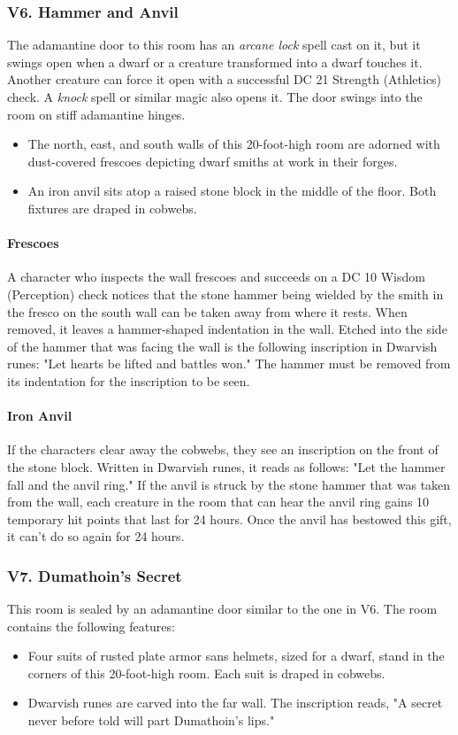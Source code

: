 \documentclass[10pt,a4paper,twoside,twocolumn,openany,nodeprecatedcode]{dndbook}
\begin{document}
\subsubsection{V6. Hammer and Anvil}
The adamantine door to this room has an \textit{arcane lock} spell cast on it, but it swings open when a dwarf or a creature transformed into a dwarf touches it. Another creature can force it open with a successful DC 21 Strength (Athletics) check. A \textit{knock} spell or similar magic also opens it. The door swings into the room on stiff adamantine hinges.
\begin{itemize}

\item The north, east, and south walls of this 20-foot-high room are adorned with dust-covered frescoes depicting dwarf smiths at work in their forges.
\item An iron anvil sits atop a raised stone block in the middle of the floor. Both fixtures are draped in cobwebs.
\end{itemize}


\paragraph{Frescoes}
A character who inspects the wall frescoes and succeeds on a DC 10 Wisdom (Perception) check notices that the stone hammer being wielded by the smith in the fresco on the south wall can be taken away from where it rests. When removed, it leaves a hammer-shaped indentation in the wall. Etched into the side of the hammer that was facing the wall is the following inscription in Dwarvish runes: "Let hearts be lifted and battles won." The hammer must be removed from its indentation for the inscription to be seen.
\paragraph{Iron Anvil}
If the characters clear away the cobwebs, they see an inscription on the front of the stone block. Written in Dwarvish runes, it reads as follows: "Let the hammer fall and the anvil ring."
If the anvil is struck by the stone hammer that was taken from the wall, each creature in the room that can hear the anvil ring gains 10 temporary hit points that last for 24 hours. Once the anvil has bestowed this gift, it can't do so again for 24 hours.
\subsubsection{V7. Dumathoin's Secret}
This room is sealed by an adamantine door similar to the one in V6. The room contains the following features:
\begin{itemize}

\item Four suits of rusted plate armor sans helmets, sized for a dwarf, stand in the corners of this 20-foot-high room. Each suit is draped in cobwebs.
\item Dwarvish runes are carved into the far wall. The inscription reads, "A secret never before told will part Dumathoin's lips."
\end{itemize}
\end{document}
